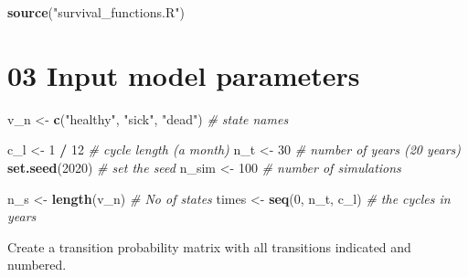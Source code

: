 \documentclass[
]{article}
\newenvironment{Shaded}{\begin{snugshade}}{\end{snugshade}}
\newcommand{\CommentTok}[1]{\textcolor[rgb]{0.56,0.35,0.01}{\textit{#1}}}
\newcommand{\DecValTok}[1]{\textcolor[rgb]{0.00,0.00,0.81}{#1}}
\newcommand{\KeywordTok}[1]{\textcolor[rgb]{0.13,0.29,0.53}{\textbf{#1}}}
\newcommand{\NormalTok}[1]{#1}
\newcommand{\OperatorTok}[1]{\textcolor[rgb]{0.81,0.36,0.00}{\textbf{#1}}}
\newcommand{\StringTok}[1]{\textcolor[rgb]{0.31,0.60,0.02}{#1}}
\begin{document}
\begin{Shaded}
\begin{Highlighting}[]
\KeywordTok{source}\NormalTok{(}\StringTok{"survival_functions.R"}\NormalTok{)}
\end{Highlighting}
\end{Shaded}

\hypertarget{input-model-parameters}{%
\section{03 Input model parameters}\label{input-model-parameters}}

\begin{Shaded}
\begin{Highlighting}[]
\NormalTok{v_n       <-}\StringTok{ }\KeywordTok{c}\NormalTok{(}\StringTok{"healthy"}\NormalTok{, }\StringTok{"sick"}\NormalTok{, }\StringTok{"dead"}\NormalTok{)  }\CommentTok{# state names}

\NormalTok{c_l       <-}\StringTok{ }\DecValTok{1} \OperatorTok{/}\StringTok{ }\DecValTok{12}                        \CommentTok{# cycle length (a month)}
\NormalTok{n_t       <-}\StringTok{ }\DecValTok{30}                            \CommentTok{# number of years (20 years)}
\KeywordTok{set.seed}\NormalTok{(}\DecValTok{2020}\NormalTok{)                             }\CommentTok{# set the seed}
\NormalTok{n_sim     <-}\StringTok{ }\DecValTok{100}                           \CommentTok{# number of simulations}

\NormalTok{n_s       <-}\StringTok{ }\KeywordTok{length}\NormalTok{(v_n)                   }\CommentTok{# No of states }
\NormalTok{times     <-}\StringTok{ }\KeywordTok{seq}\NormalTok{(}\DecValTok{0}\NormalTok{, n_t, c_l)              }\CommentTok{# the cycles in years}
\end{Highlighting}
\end{Shaded}

Create a transition probability matrix with all transitions indicated
and numbered.
\end{document}
